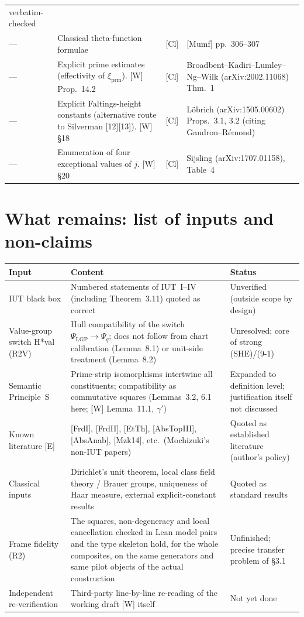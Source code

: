 \documentclass[11pt]{article}
\begin{document}
\begin{longtable}{p{2.1cm}p{6.4cm}p{1.1cm}p{4.6cm}}
verbatim-checked\\
--- & Classical theta-function formulae & [Cl] & [Mumf] pp.~306--307\\
--- & Explicit prime estimates (effectivity of
$\xi_{\mathrm{prm}}$). [W] Prop.~14.2 & [Cl] &
Broadbent--Kadiri--Lumley--Ng--Wilk (arXiv:2002.11068) Thm.~1\\
--- & Explicit Faltings-height constants (alternative route to
Silverman [12][13]). [W] \S18 & [Cl] & L\"obrich
(arXiv:1505.00602) Props.~3.1, 3.2 (citing Gaudron--R\'emond)\\
--- & Enumeration of four exceptional values of $j$. [W] \S20 &
[Cl] & Sijsling (arXiv:1707.01158), Table~4\\
\bottomrule
\end{longtable}

\section{What remains: list of inputs and non-claims}

\begin{center}
\begin{tabular}{p{3.6cm}p{6.8cm}p{4.4cm}}
\toprule
Input & Content & Status\\
\midrule
IUT black box & Numbered statements of IUT~I--IV (including
Theorem~3.11) quoted as correct & Unverified (outside scope by
design)\\
Value-group switch H*val (R2V) & Hull compatibility of the switch
$\Psi_{\mathrm{LGP}}\to\Psi_q$; does not follow from chart
calibration (Lemma~8.1) or unit-side treatment (Lemma~8.2) &
Unresolved; core of strong (SHE)/(9-1)\\
Semantic Principle~S & Prime-strip isomorphisms intertwine all
constituents; compatibility as commutative squares (Lemmas~3.2, 6.1
here; [W] Lemma~11.1, $\gamma'$) & Expanded to definition level;
justification itself not discussed\\
Known literature [E] & [FrdI], [FrdII], [EtTh], [AbsTopIII],
[AbsAnab], [Mzk14], etc.\ (Mochizuki's non-IUT papers) & Quoted as
established literature (author's policy)\\
Classical inputs & Dirichlet's unit theorem, local class field
theory / Brauer groups, uniqueness of Haar measure, external
explicit-constant results & Quoted as standard results\\
Frame fidelity (R2) & The squares, non-degeneracy and local
cancellation checked in Lean model pairs and the type skeleton hold,
for the whole composites, on the same generators and same pilot
objects of the actual construction & Unfinished; precise transfer
problem of \S3.1\\
Independent re-verification & Third-party line-by-line re-reading of
the working draft [W] itself & Not yet done\\
\bottomrule
\end{tabular}
\end{center}
\end{document}
